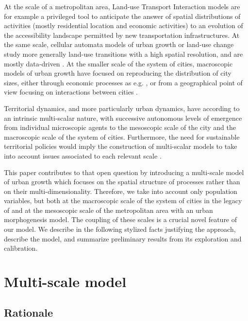 \documentclass[11pt]{article}
\begin{document}
At the scale of a metropolitan area, Land-use Transport Interaction models \cite{wegener2004land} are for example a privileged tool to anticipate the answer of spatial distributions of activities (mostly residential location and economic activities) to an evolution of the accessibility landscape permitted by new transportation infrastructures. At the same scale, cellular automata models of urban growth or land-use change study more generally land-use transitions with a high spatial resolution, and are mostly data-driven \cite{clarke2007decade}. At the smaller scale of the system of cities, macroscopic models of urban growth have focused on reproducing the distribution of city sizes, either through economic processes as e.g. \cite{gabaix1999zipf}, or from a geographical point of view focusing on interactions between cities \cite{favaro2011gibrat}.

Territorial dynamics, and more particularly urban dynamics, have according to \cite{pumain1997pour} an intrinsic multi-scalar nature, with successive autonomous levels of emergence from individual microscopic agents to the mesoscopic scale of the city and the macroscopic scale of the system of cities. Furthermore, the need for sustainable territorial policies would imply the construction of multi-scalar models to take into account issues associated to each relevant scale \cite{Rozenblat2018}.

This paper contributes to that open question by introducing a multi-scale model of urban growth which focuses on the spatial structure of processes rather than on their multi-dimensionality. Therefore, we take into account only population variables, but both at the macroscopic scale of the system of cities in the legacy of \cite{pumain2017urban} and at the mesoscopic scale of the metropolitan area with an urban morphogenesis model. The coupling of these scales is a crucial novel feature of our model. We describe in the following stylized facts justifying the approach, describe the model, and summarize preliminary results from its exploration and calibration.



\section{Multi-scale model}

\subsection{Rationale}
\end{document}
